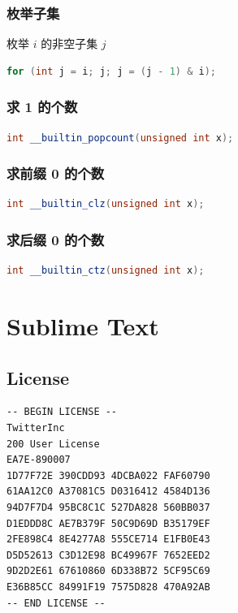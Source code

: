 \documentclass{article}
\begin{document}
\subsubsection{枚举子集}

枚举 $i$ 的非空子集 $j$

\begin{lstlisting}[language=C++]
for (int j = i; j; j = (j - 1) & i);
\end{lstlisting}

\subsubsection{求 1 的个数}

\begin{lstlisting}[language=C++]
int __builtin_popcount(unsigned int x);
\end{lstlisting}

\subsubsection{求前缀 0 的个数}

\begin{lstlisting}[language=C++]
int __builtin_clz(unsigned int x);
\end{lstlisting}

\subsubsection{求后缀 0 的个数}

\begin{lstlisting}[language=C++]
int __builtin_ctz(unsigned int x);
\end{lstlisting}

\section{Sublime Text}

\subsection{License}

\begin{lstlisting}
-- BEGIN LICENSE --
TwitterInc
200 User License
EA7E-890007
1D77F72E 390CDD93 4DCBA022 FAF60790
61AA12C0 A37081C5 D0316412 4584D136
94D7F7D4 95BC8C1C 527DA828 560BB037
D1EDDD8C AE7B379F 50C9D69D B35179EF
2FE898C4 8E4277A8 555CE714 E1FB0E43
D5D52613 C3D12E98 BC49967F 7652EED2
9D2D2E61 67610860 6D338B72 5CF95C69
E36B85CC 84991F19 7575D828 470A92AB
-- END LICENSE --
\end{lstlisting}
\end{document}
